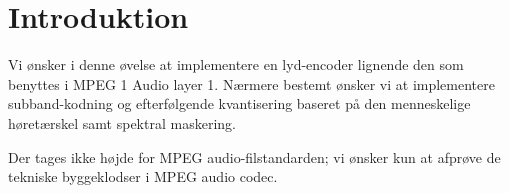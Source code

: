 \section{Introduktion}
Vi ønsker i denne øvelse at implementere en lyd-encoder lignende den som benyttes i MPEG 1 Audio layer 1. Nærmere bestemt ønsker vi at implementere subband-kodning og efterfølgende kvantisering baseret på den menneskelige høretærskel samt spektral maskering.

Der tages ikke højde for MPEG audio-filstandarden; vi ønsker kun at afprøve de tekniske byggeklodser i MPEG audio codec.
